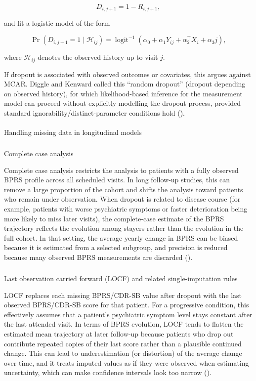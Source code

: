 \documentclass[
  9pt,
  letterpaper,
  DIV=11,
  numbers=noendperiod]{scrartcl}
\makeatletter
\let\oldparagraph\paragraph
\renewcommand{\paragraph}{
    \@ifstar
      \xxxParagraphStar
      \xxxParagraphNoStar
  }
\newcommand{\xxxParagraphStar}[1]{\oldparagraph*{#1}\mbox{}}
\newcommand{\xxxParagraphNoStar}[1]{\oldparagraph{#1}\mbox{}}
\let\oldsubparagraph\subparagraph
\renewcommand{\subparagraph}{
    \@ifstar
      \xxxSubParagraphStar
      \xxxSubParagraphNoStar
  }
\newcommand{\xxxSubParagraphStar}[1]{\oldsubparagraph*{#1}\mbox{}}
\newcommand{\xxxSubParagraphNoStar}[1]{\oldsubparagraph{#1}\mbox{}}
\makeatother
\begin{document}
\[
D_{i,j+1} = 1 - R_{i,j+1},
\]

and fit a logistic model of the form

\[
\Pr(D_{i,j+1}=1 \mid \mathcal{H}_{ij})
=
\operatorname{logit}^{-1}\!\left(
\alpha_0 + \alpha_1 Y_{ij} + \alpha_2^\top X_i + \alpha_3 j
\right),
\]

where \(\mathcal{H}_{ij}\) denotes the observed history up to visit
\(j\).

If dropout is associated with observed outcomes or covariates, this
argues against MCAR. Diggle and Kenward called this ``random dropout''
(dropout depending on observed history), for which likelihood-based
inference for the measurement model can proceed without explicitly
modelling the dropout process, provided standard
ignorability/distinct-parameter conditions hold
().

\paragraph{Handling missing data in longitudinal
models}\label{handling-missing-data-in-longitudinal-models}

\subparagraph{Complete case analysis}\label{complete-case-analysis}

Complete case analysis restricts the analysis to patients with a fully
observed BPRS profile across all scheduled visits. In long follow-up
studies, this can remove a large proportion of the cohort and shifts the
analysis toward patients who remain under observation. When dropout is
related to disease course (for example, patients with worse psychiatric
symptoms or faster deterioration being more likely to miss later
visits), the complete-case estimate of the BPRS trajectory reflects the
evolution among stayers rather than the evolution in the full cohort. In
that setting, the average yearly change in BPRS can be biased because it
is estimated from a selected subgroup, and precision is reduced because
many observed BPRS measurements are discarded
().

\subparagraph{Last observation carried forward (LOCF) and related
single-imputation
rules}\label{last-observation-carried-forward-locf-and-related-single-imputation-rules}

LOCF replaces each missing BPRS/CDR-SB value after dropout with the last
observed BPRS/CDR-SB score for that patient. For a progressive
condition, this effectively assumes that a patient's psychiatric symptom
level stays constant after the last attended visit. In terms of BPRS
evolution, LOCF tends to flatten the estimated mean trajectory at later
follow-up because patients who drop out contribute repeated copies of
their last score rather than a plausible continued change. This can lead
to underestimation (or distortion) of the average change over time, and
it treats imputed values as if they were observed when estimating
uncertainty, which can make confidence intervals look too narrow
().
\end{document}
